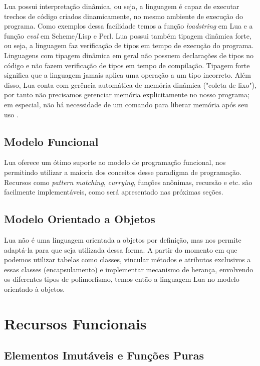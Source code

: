 \documentclass[rel_mlp]{iiufrgs}
\begin{document}
Lua possui interpretação dinâmica, ou seja, a linguagem é capaz de executar trechos de código criados dinamicamente, no mesmo ambiente de execução do programa. Como exemplos dessa facilidade temos a função \textit{loadstring} em Lua e a função \textit{eval} em Scheme/Lisp e Perl. Lua possui também tipagem dinâmica forte, ou seja, a linguagem faz verificação de tipos em tempo de execução do programa. Linguagens com
tipagem dinâmica em geral não possuem declarações de tipos no código e não fazem verificação de tipos em tempo de compilação. Tipagem forte significa que a linguagem jamais aplica uma operação a um tipo incorreto. Além disso, Lua conta com gerência automática de memória dinâmica ("coleta de lixo"), por tanto não precisamos gerenciar memória explicitamente no nosso programa; em especial, não há necessidade de um comando para liberar memória após seu uso \cite{IntroLuaPDF}.

\section{Modelo Funcional}

Lua oferece um ótimo suporte ao modelo de programação funcional, nos permitindo utilizar a maioria dos conceitos desse paradigma de programação. Recursos como \textit{pattern matching}, \textit{currying}, funções anônimas, recursão e etc. são facilmente implementáveis, como será apresentado nas próximas seções. \cite{ManualLua}

\section{Modelo Orientado a Objetos}

Lua não é uma linguagem orientada a objetos por definição, mas nos permite adaptá-la para que seja utilizada dessa forma. A partir do momento em que podemos utilizar tabelas como classes, vincular métodos e atributos exclusivos a essas classes (encapsulamento) e implementar mecanismo de herança, envolvendo os diferentes tipos de polimorfismo, temos então a linguagem Lua no modelo orientado à objetos.



\chapter{Recursos Funcionais}

\section{Elementos Imutáveis e Funções Puras}
\end{document}
